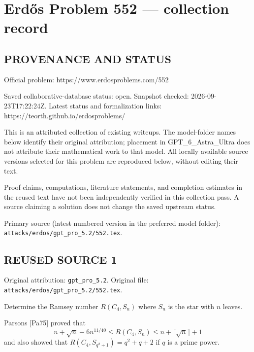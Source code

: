 \section*{Erd\H{o}s Problem 552 --- collection record}

\subsection*{PROVENANCE AND STATUS}
Official problem: https://www.erdosproblems.com/552

Saved collaborative-database status: open.
Snapshot checked: 2026-09-23T17:22:24Z.
Latest status and formalization links: https://teorth.github.io/erdosproblems/

This is an attributed collection of existing writeups. The model-folder names below identify their original attribution; placement in GPT\_6\_Astra\_Ultra does not attribute their mathematical work to that model. All locally available source versions selected for this problem are reproduced below, without editing their text.

Proof claims, computations, literature statements, and completion estimates in the reused text have not been independently verified in this collection pass. A source claiming a solution does not change the saved upstream status.

Primary source (latest numbered version in the preferred model folder): \texttt{attacks/erdos/gpt\_pro\_5.2/552.tex}.

\subsection*{REUSED SOURCE 1}
Original attribution: \texttt{gpt\_pro\_5.2}.
Original file: \texttt{attacks/erdos/gpt\_pro\_5.2/552.tex}.


Determine the Ramsey number $R(C_4,S_n)$ where $S_n$ is the star with $n$ leaves.

Parsons [Pa75] proved that
\[
n+\sqrt{n}-6n^{11/40}\leq R(C_4,S_n)\leq n+\lceil\sqrt{n}\rceil+1
\]
and also showed that $R(C_4,S_{q^2+1})=q^2+q+2$ if $q$ is a prime power.

